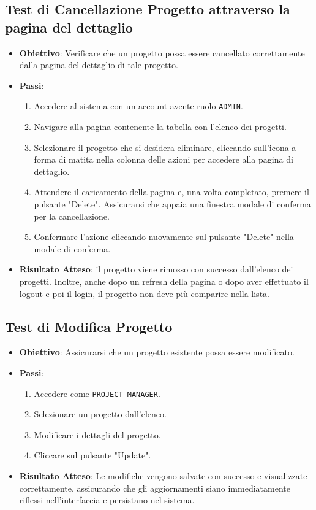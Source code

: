 \documentclass[target=bach,aauheader=,style=]{thud}
\begin{document}
\subsection{Test di Cancellazione Progetto attraverso la pagina del dettaglio}
\begin{itemize}
    \item \textbf{Obiettivo}: Verificare che un progetto possa essere cancellato correttamente dalla pagina del dettaglio di tale progetto.
    \item \textbf{Passi}:
    \begin{enumerate}
        \item Accedere al sistema con un account avente ruolo \texttt{ADMIN}.
        \item Navigare alla pagina contenente la tabella con l'elenco dei progetti.
        \item Selezionare il progetto che si desidera eliminare, cliccando sull'icona a forma di matita nella colonna delle azioni per accedere alla pagina di dettaglio.
        \item Attendere il caricamento della pagina e, una volta completato, premere il pulsante "Delete". Assicurarsi che appaia una finestra modale di conferma per la cancellazione.
        \item Confermare l'azione cliccando nuovamente sul pulsante "Delete" nella modale di conferma.
    \end{enumerate}
    \item \textbf{Risultato Atteso}: il progetto viene rimosso con successo dall'elenco dei progetti. Inoltre, anche dopo un refresh della pagina o dopo aver effettuato il logout e poi il login, il progetto non deve più comparire nella lista.
\end{itemize}


\subsection{Test di Modifica Progetto}
\begin{itemize}
    \item \textbf{Obiettivo}: Assicurarsi che un progetto esistente possa essere modificato.
    \item \textbf{Passi}:
    \begin{enumerate}
        \item Accedere come \texttt{PROJECT MANAGER}.
        \item Selezionare un progetto dall'elenco.
        \item Modificare i dettagli del progetto.
        \item Cliccare sul pulsante "Update".
    \end{enumerate}
    \item \textbf{Risultato Atteso}: Le modifiche vengono salvate con successo e visualizzate correttamente, assicurando che gli aggiornamenti siano immediatamente riflessi nell'interfaccia e persistano nel sistema.
\end{itemize}
\end{document}

